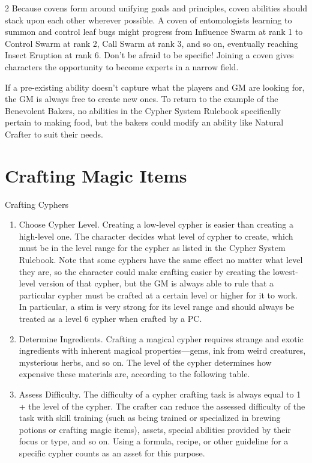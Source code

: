 \begin{multicols}{2}
Because covens form around unifying goals and principles, coven abilities should stack upon each other wherever possible. A coven of entomologists learning to summon and control leaf bugs might progress from Influence Swarm at rank 1 to Control Swarm at rank 2, Call Swarm at rank 3, and so on, eventually reaching Insect Eruption at rank 6. Don’t be afraid to be specific! Joining a coven gives characters the opportunity to become experts in a narrow field. 

If a pre-existing ability doesn’t capture what the players and GM are looking for, the GM is always free to create new ones. To return to the example of the Benevolent Bakers, no abilities in the Cypher System Rulebook specifically pertain to making food, but the bakers could modify an ability like Natural Crafter to suit their needs.

\chapter{Crafting Magic Items}

Crafting Cyphers

\begin{enumerate}
\item Choose Cypher Level. Creating a low-level cypher is easier than creating a high-level one. The character decides what level of cypher to create, which must be in the level range for the cypher as listed in the Cypher System Rulebook. Note that some cyphers have the same effect no matter what level they are, so the character could make crafting easier by creating the lowest-level version of that cypher, but the GM is always able to rule that a particular cypher must be crafted at a certain level or higher for it to work. In particular, a stim is very strong for its level range and should always be treated as a level 6 cypher when crafted by a PC. 
\item Determine Ingredients. Crafting a magical cypher requires strange and exotic ingredients with inherent magical properties—gems, ink from weird creatures, mysterious herbs, and so on. The level of the cypher determines how expensive these materials are, according to the following table.
\item Assess Difficulty. The difficulty of a cypher crafting task is always equal to 1 + the level of the cypher. The crafter can reduce the assessed difficulty of the task with skill training (such as being trained or specialized in brewing potions or crafting magic items), assets, special abilities provided by their focus or type, and so on. Using a formula, recipe, or other guideline for a specific cypher counts as an asset for this purpose. 


\end{enumerate}
\end{multicols}
